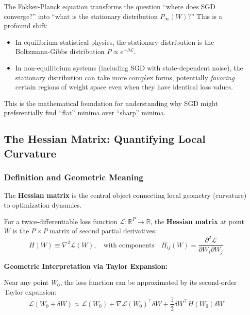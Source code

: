 \documentclass[
  journal=largetwo,
  simfonts=false,
  year=2025,
  volume=37,
]{cup-journal}
\begin{document}
\begin{remark}
The Fokker-Planck equation transforms the question ``where does SGD converge?'' into ``what is the stationary distribution $P_{\infty}(W)$?'' This is a profound shift:
\begin{itemize}
    \item In equilibrium statistical physics, the stationary distribution is the Boltzmann-Gibbs distribution $P \propto e^{-\beta \mathcal{L}}$.
    \item In non-equilibrium systems (including SGD with state-dependent noise), the stationary distribution can take more complex forms, potentially \textit{favoring} certain regions of weight space even when they have identical loss values.
\end{itemize}
This is the mathematical foundation for understanding why SGD might preferentially find ``flat'' minima over ``sharp'' minima.
\end{remark}

\subsection{The Hessian Matrix: Quantifying Local Curvature}

\subsubsection{Definition and Geometric Meaning}

The \textbf{Hessian matrix} is the central object connecting local geometry (curvature) to optimization dynamics.

\begin{definition}\label{def:hessian}
For a twice-differentiable loss function $\mathcal{L}: \mathbb{R}^P \to \mathbb{R}$, the \textbf{Hessian matrix} at point $W$ is the $P \times P$ matrix of second partial derivatives:
\begin{equation}\label{eq:hessian_def}
    H(W) \equiv \nabla^2 \mathcal{L}(W), \quad \text{with components} \quad H_{ij}(W) = \frac{\partial^2 \mathcal{L}}{\partial W_i \partial W_j}
\end{equation}
\end{definition}

\textbf{Geometric Interpretation via Taylor Expansion:}

Near any point $W_0$, the loss function can be approximated by its second-order Taylor expansion:
\begin{equation}\label{eq:taylor_loss}
    \mathcal{L}(W_0 + \delta W) \approx \mathcal{L}(W_0) + \nabla \mathcal{L}(W_0)^\top \delta W + \frac{1}{2} \delta W^\top H(W_0) \delta W
\end{equation}
\end{document}
